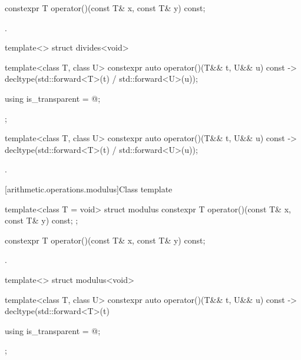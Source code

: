 %
\begin{itemdecl}
constexpr T operator()(const T& x, const T& y) const;
\end{itemdecl}

\begin{itemdescr}
\pnum
\returns
{}.
\end{itemdescr}

%
\begin{itemdecl}
template<> struct divides<void> {
  template<class T, class U> constexpr auto operator()(T&& t, U&& u) const
    -> decltype(std::forward<T>(t) / std::forward<U>(u));

  using is_transparent = @\unspec@;
};
\end{itemdecl}

%
\begin{itemdecl}
template<class T, class U> constexpr auto operator()(T&& t, U&& u) const
    -> decltype(std::forward<T>(t) / std::forward<U>(u));
\end{itemdecl}

\begin{itemdescr}
\pnum
\returns
{}.
\end{itemdescr}

[arithmetic.operations.modulus]{Class template }

%
\begin{itemdecl}
template<class T = void> struct modulus {
  constexpr T operator()(const T& x, const T& y) const;
};
\end{itemdecl}

%
\begin{itemdecl}
constexpr T operator()(const T& x, const T& y) const;
\end{itemdecl}

\begin{itemdescr}
\pnum
\returns
{}.
\end{itemdescr}

%
\begin{itemdecl}
template<> struct modulus<void> {
  template<class T, class U> constexpr auto operator()(T&& t, U&& u) const
    -> decltype(std::forward<T>(t) %

  using is_transparent = @\unspec@;
};
\end{itemdecl}

